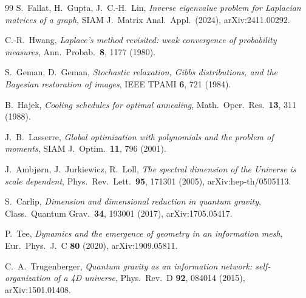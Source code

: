 \documentclass[11pt]{article}
\theoremstyle{definition}
\theoremstyle{plain}
\begin{document}
\begin{thebibliography}{99}
 S.~Fallat, H.~Gupta, J.~C.-H.~Lin,
\emph{Inverse eigenvalue problem for Laplacian matrices of a graph}, SIAM J.\ Matrix Anal.\ Appl.\ (2024), arXiv:2411.00292.

 C.-R.~Hwang,
\emph{Laplace's method revisited: weak convergence of probability measures}, Ann.\ Probab.\ \textbf{8}, 1177 (1980).

 S.~Geman, D.~Geman,
\emph{Stochastic relaxation, Gibbs distributions, and the Bayesian restoration of images}, IEEE TPAMI \textbf{6}, 721 (1984).

 B.~Hajek,
\emph{Cooling schedules for optimal annealing}, Math.\ Oper.\ Res.\ \textbf{13}, 311 (1988).

 J.~B.~Lasserre,
\emph{Global optimization with polynomials and the problem of moments}, SIAM J.\ Optim.\ \textbf{11}, 796 (2001).

 J.~Ambj\o rn, J.~Jurkiewicz, R.~Loll,
\emph{The spectral dimension of the Universe is scale dependent}, Phys.\ Rev.\ Lett.\ \textbf{95}, 171301 (2005), arXiv:hep-th/0505113.

 S.~Carlip,
\emph{Dimension and dimensional reduction in quantum gravity}, Class.\ Quantum Grav.\ \textbf{34}, 193001 (2017), arXiv:1705.05417.

 P.~Tee,
\emph{Dynamics and the emergence of geometry in an information mesh}, Eur.\ Phys.\ J.\ C \textbf{80} (2020), arXiv:1909.05811.

 C.~A.~Trugenberger,
\emph{Quantum gravity as an information network: self-organization of a 4D universe}, Phys.\ Rev.\ D \textbf{92}, 084014 (2015), arXiv:1501.01408.

\end{thebibliography}
\end{document}
